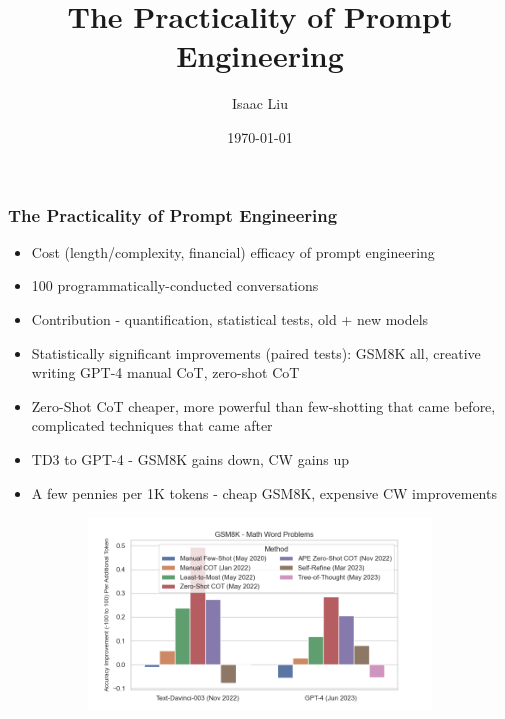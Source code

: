 \documentclass{beamer}
\title[The Practicality of Prompt Engineering]{The Practicality of Prompt Engineering}
\author{Isaac Liu}
\date{\today}
\begin{document}
    \begin{frame}
        \frametitle{The Practicality of Prompt Engineering}
        \begin{itemize}
            \scriptsize
            \item Cost (length/complexity, financial) efficacy of prompt engineering
            \item 100 programmatically-conducted conversations
            \item Contribution - quantification, statistical tests, old + new models
            \item Statistically significant improvements (paired tests): GSM8K all, creative writing GPT-4 manual CoT, zero-shot CoT
            \item Zero-Shot CoT cheaper, more powerful than few-shotting that came before, complicated techniques that came after
            \item TD3 to GPT-4 - GSM8K gains down, CW gains up
            \item A few pennies per 1K tokens - cheap GSM8K, expensive CW improvements
        \end{itemize}
        \begin{figure}[h]
            \begin{subfigure}[h]{0.4925\textwidth}
                \centering
                \includegraphics[width=1.1\hsize]{../Output/gsm8k_change_in_accuracy_quality_per_change_in_conversation_length_sorted_by_technique_age.png} 
            \end{subfigure}
            \begin{subfigure}[h]{0.4925\textwidth}

\end{subfigure}
\end{figure}
\end{frame}
\end{document}
